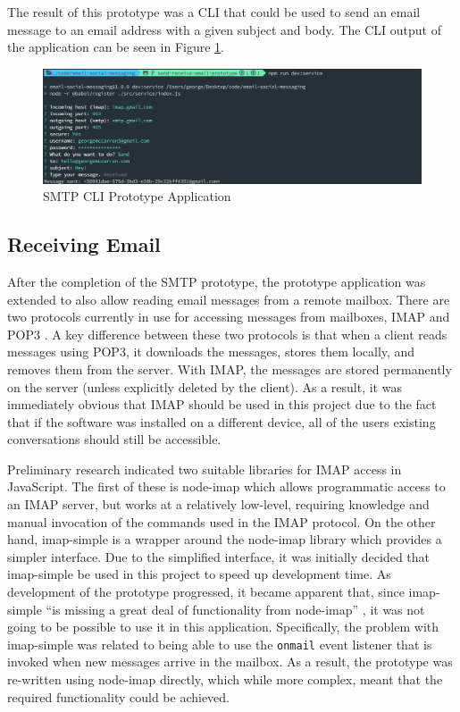 The result of this prototype was a CLI that could be used to send an email message to an email address with a given subject and body. The CLI output of the application can be seen in Figure \ref{fig:smtp-cli}.

\begin{figure}[h!]
  \centering
  \includegraphics[width=\textwidth]{images/smtp-cli.png}
  \caption{SMTP CLI Prototype Application}
  \label{fig:smtp-cli}
\end{figure}

\subsection{Receiving Email}
After the completion of the SMTP prototype, the prototype application was extended to also allow reading email messages from a remote mailbox. There are two protocols currently in use for accessing messages from mailboxes, IMAP \cite{imap-rfc} and POP3 \cite{pop-rfc}. A key difference between these two protocols is that when a client reads messages using POP3, it downloads the messages, stores them locally, and removes them from the server. With IMAP, the messages are stored permanently on the server (unless explicitly deleted by the client). As a result, it was immediately obvious that IMAP should be used in this project due to the fact that if the software was installed on a different device, all of the users existing conversations should still be accessible.

Preliminary research indicated two suitable libraries for IMAP access in JavaScript. The first of these is node-imap \cite{node-imap} which allows programmatic access to an IMAP server, but works at a relatively low-level, requiring knowledge and manual invocation of the commands used in the IMAP protocol. On the other hand, imap-simple \cite{imap-simple} is a wrapper around the node-imap library which provides a simpler interface. Due to the simplified interface, it was initially decided that imap-simple be used in this project to speed up development time. As development of the prototype progressed, it became apparent that, since imap-simple ``is missing a great deal of functionality from node-imap'' \cite{imap-simple}, it was not going to be possible to use it in this application. 
Specifically, the problem with imap-simple was related to being able to use the \texttt{onmail} event listener that is invoked when new messages arrive in the mailbox. As a result, the prototype was re-written using node-imap directly, which while more complex, meant that the required functionality could be achieved.

